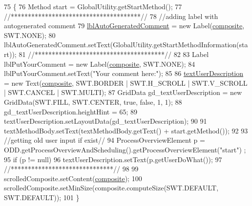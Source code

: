 \begin{DoxyCode}
75                                   \{
76         Method start = GlobalUtility.getStartMethod();
77         \textcolor{comment}{//**************************************//}
78         \textcolor{comment}{//adding label with autogenerated comment}
79         \hyperlink{classit_1_1isislab_1_1masonassisteddocumentation_1_1mason_1_1wizards_1_1_i___start_information_page_aca7f53a1faffbca69e3509af27117c2f}{lblAutoGeneratedComment} = \textcolor{keyword}{new} Label(\hyperlink{classit_1_1isislab_1_1masonassisteddocumentation_1_1mason_1_1wizards_1_1_i___start_information_page_a0b4e57697b3d0beb37e32157277604c9}{composite}, SWT.NONE);
80         lblAutoGeneratedComment.setText(GlobalUtility.getStartMethodInformation(start));
81         \textcolor{comment}{//**************************************//}
82         
83         Label lblPutYourComment = \textcolor{keyword}{new} Label(\hyperlink{classit_1_1isislab_1_1masonassisteddocumentation_1_1mason_1_1wizards_1_1_i___start_information_page_a0b4e57697b3d0beb37e32157277604c9}{composite}, SWT.NONE);
84         lblPutYourComment.setText(\textcolor{stringliteral}{"Your comment here:"});
85         
86         \hyperlink{classit_1_1isislab_1_1masonassisteddocumentation_1_1mason_1_1wizards_1_1_i___start_information_page_ae9194cb7a9d204939dbea568a7b4d0e2}{textUserDescription} = \textcolor{keyword}{new} Text(\hyperlink{classit_1_1isislab_1_1masonassisteddocumentation_1_1mason_1_1wizards_1_1_i___start_information_page_a0b4e57697b3d0beb37e32157277604c9}{composite}, SWT.BORDER | SWT.H\_SCROLL | 
      SWT.V\_SCROLL | SWT.CANCEL | SWT.MULTI);
87         GridData gd\_textUserDescription = \textcolor{keyword}{new} GridData(SWT.FILL, SWT.CENTER, \textcolor{keyword}{true}, \textcolor{keyword}{false}, 1, 1);
88         gd\_textUserDescription.heightHint = 65;
89         textUserDescription.setLayoutData(gd\_textUserDescription);
90         
91         textMethodBody.setText(textMethodBody.getText() +  start.getMethod());
92 
93         \textcolor{comment}{//getting old user input if exist//}
94         ProcessOverviewElement p = ODD.getProcessOverviewAndScheduling().getProcessOverviewElement(\textcolor{stringliteral}{"start"})
      ;
95         \textcolor{keywordflow}{if} (p != null)
96             textUserDescription.setText(p.getUserDoWhat());
97         \textcolor{comment}{//******************************//}
98         
99         scrolledComposite.setContent(\hyperlink{classit_1_1isislab_1_1masonassisteddocumentation_1_1mason_1_1wizards_1_1_i___start_information_page_a0b4e57697b3d0beb37e32157277604c9}{composite});
100         scrolledComposite.setMinSize(composite.computeSize(SWT.DEFAULT, SWT.DEFAULT));
101     \}
\end{DoxyCode}


